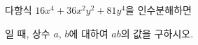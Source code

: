 다항식 $16x^4+36x^2y^2+81y^4$을 인수분해하면\par\smallskip{}\par\smallskip\noindent 일 때, 상수 $a$, $b$에 대하여 $ab$의 값을 구하시오.
